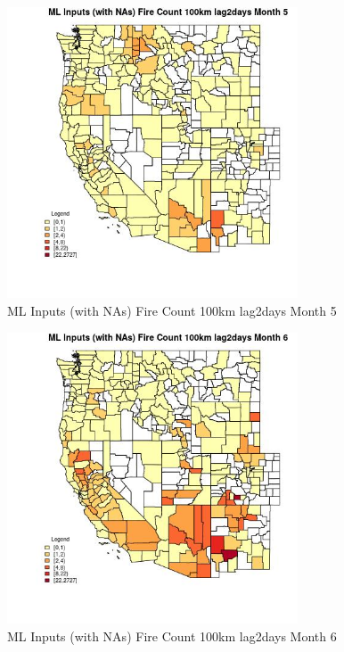 \begin{figure} 
\centering  
\includegraphics[width=0.77\textwidth]{Code_Outputs/Report_ML_input_PM25_Step4_part_f_de_duplicated_aves_prioritize_24hr_obswNAs_CountyFire_Count_100km_lag2daysmedianMonth5.jpg} 
\caption{\label{fig:Report_ML_input_PM25_Step4_part_f_de_duplicated_aves_prioritize_24hr_obswNAsCountyFire_Count_100km_lag2daysmedianMonth5}ML Inputs (with NAs) Fire Count 100km lag2days Month 5} 
\end{figure} 
 

\begin{figure} 
\centering  
\includegraphics[width=0.77\textwidth]{Code_Outputs/Report_ML_input_PM25_Step4_part_f_de_duplicated_aves_prioritize_24hr_obswNAs_CountyFire_Count_100km_lag2daysmedianMonth6.jpg} 
\caption{\label{fig:Report_ML_input_PM25_Step4_part_f_de_duplicated_aves_prioritize_24hr_obswNAsCountyFire_Count_100km_lag2daysmedianMonth6}ML Inputs (with NAs) Fire Count 100km lag2days Month 6} 
\end{figure} 
 

